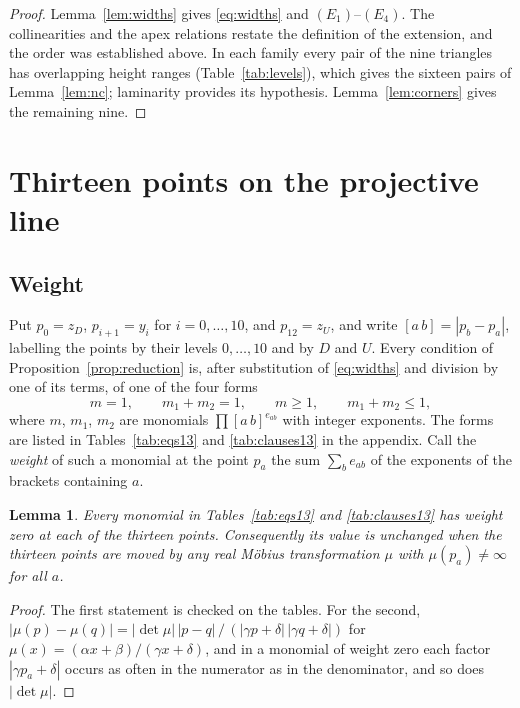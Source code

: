 \documentclass[11pt,a4paper]{article}
\newtheorem{lemma}[theorem]{Lemma}
\theoremstyle{definition}
\theoremstyle{remark}
\newcommand{\br}[2]{[#1\,#2]}
\begin{document}
\begin{proof}
Lemma~\ref{lem:widths} gives \eqref{eq:widths} and $(E_1)$--$(E_4)$. The collinearities and the apex
relations restate the definition of the extension, and the order was established above. In each family
every pair of the nine triangles has overlapping height ranges (Table~\ref{tab:levels}), which gives the
sixteen pairs of Lemma~\ref{lem:nc}; laminarity provides its hypothesis. Lemma~\ref{lem:corners} gives the
remaining nine.
\end{proof}

\section{Thirteen points on the projective line}\label{sec:thirteen}

\subsection{Weight}
Put $p_0 = z_D$, $p_{i+1} = y_i$ for $i = 0, \dots, 10$, and $p_{12} = z_U$, and write
$\br{a}{b} = |p_b - p_a|$, labelling the points by their levels $0, \dots, 10$ and by $D$ and $U$. Every
condition of Proposition~\ref{prop:reduction} is, after substitution of \eqref{eq:widths} and division by
one of its terms, of one of the four forms
\begin{equation}\label{eq:forms}
m = 1,\qquad m_1 + m_2 = 1,\qquad m \ge 1,\qquad m_1 + m_2 \le 1,
\end{equation}
where $m$, $m_1$, $m_2$ are monomials $\prod \br{a}{b}^{e_{ab}}$ with integer exponents. The forms are
listed in Tables~\ref{tab:eqs13} and \ref{tab:clauses13} in the appendix. Call the \emph{weight} of such a
monomial at the point $p_a$ the sum $\sum_b e_{ab}$ of the exponents of the brackets containing $a$.

\begin{lemma}\label{lem:weight}
Every monomial in Tables~\ref{tab:eqs13} and \ref{tab:clauses13} has weight zero at each of the thirteen
points. Consequently its value is unchanged when the thirteen points are moved by any real Möbius
transformation $\mu$ with $\mu(p_a) \ne \infty$ for all $a$.
\end{lemma}

\begin{proof}
The first statement is checked on the tables. For the second,
$|\mu(p) - \mu(q)| = |\det \mu|\,|p - q|\,/\,(|\gamma p + \delta|\,|\gamma q + \delta|)$ for
$\mu(x) = (\alpha x + \beta)/(\gamma x + \delta)$, and in a monomial of weight zero each factor
$|\gamma p_a + \delta|$ occurs as often in the numerator as in the denominator, and so does
$|\det\mu|$.
\end{proof}
\end{document}
